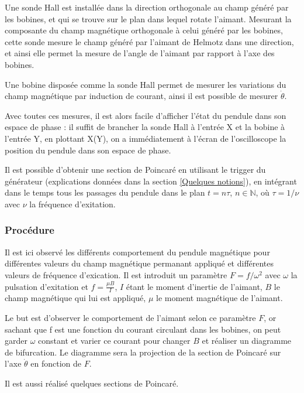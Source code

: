 \documentclass[a4paper,12pt,oneside]{article}
\begin{document}
Une sonde Hall est installée dans la direction orthogonale au champ généré par les bobines, et qui se trouve sur le plan dans lequel rotate l'aimant. Mesurant la composante du champ magnétique orthogonale à celui généré par les bobines, cette sonde mesure le champ généré par l'aimant de Helmotz dans une direction, et ainsi elle permet la mesure de l'angle de l'aimant par rapport à l'axe des bobines.

Une bobine disposée comme la sonde Hall permet de mesurer les variations du champ magnétique par induction de courant, ainsi il est possible de mesurer $\dot{\theta}$.

Avec toutes ces mesures, il est alors facile d'afficher l'état du pendule dans son espace de phase : il suffit de brancher la sonde Hall à l'entrée X et la bobine à l'entrée Y, en plottant X(Y), on a immédiatement à l'écran de l'oscilloscope la position du pendule dans son espace de phase.

Il est possible d'obtenir une section de Poincaré en utilisant le trigger du générateur (explications données dans la section \ref{Quelques notions}), en intégrant dans le temps tous les passages du pendule dans le plan $t=n\tau$, $n\in \mathbb{N}$, où $\tau=1/\nu$ avec $\nu$ la fréquence d'exitation.

\subsubsection{Procédure}

Il est ici observé les différents comportement du pendule magnétique pour différentes valeurs du champ magnétique permanant appliqué et différentes valeurs de fréquence d'exication. Il est introduit un paramètre $F=f/\omega^2$ avec $\omega$ la pulsation d'exitation et $f=\frac{\mu B}{I}$, $I$ étant le moment d'inertie de l'aimant, $B$ le champ magnétique qui lui est appliqué, $\mu$ le moment magnétique de l'aimant.

Le but est d'observer le comportement de l'aimant selon ce paramètre $F$, or sachant que f est une fonction du courant circulant dans les bobines, on peut garder $\omega$ constant et varier ce courant pour changer $B$ et réaliser un diagramme de bifurcation. Le diagramme sera la projection de la section de Poincaré sur l'axe $\dot{\theta}$ en fonction de $F$.

Il est aussi réalisé quelques sections de Poincaré.


\end{document}
